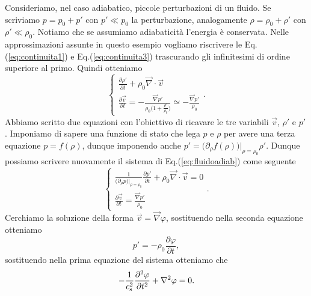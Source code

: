 \begin{example}
    Consideriamo, nel caso adiabatico, piccole perturbazioni di un fluido. Se scriviamo $p = p_0 + p'$ con $p' \ll p_0$ la perturbazione, analogamente $\rho = \rho_0 + \rho '$ con $\rho' \ll \rho_0$. Notiamo che se assumiamo adiabaticità l'energia è conservata. Nelle approssimazioni assunte in questo esempio vogliamo riscrivere le Eq.(\ref{eq:continuita1}) e Eq.(\ref{eq:continuita3}) trascurando gli infinitesimi di ordine superiore al primo. Quindi otteniamo
    \begin{equation}
        \begin{cases}
        \displaystyle\frac{\partial \rho'}{\partial t} + \rho_0 \vec{\nabla} \cdot \vec{v}\\
        \displaystyle\frac{\partial \vec{v}}{\partial t} = - \frac{\vec{\nabla}p'}{\rho_0\bigl( 1 + \frac{\rho'}{\rho_0} \bigr)} \simeq - \frac{\vec{\nabla} p'}{\rho_0}
        \end{cases}.\label{eq:fluidoadiab}
    \end{equation}
    Abbiamo scritto due equazioni con l'obiettivo di ricavare le tre variabili $\vec{v}$, $\rho'$ e $p'$. Imponiamo di sapere una funzione di stato che lega $p$ e $\rho$ per avere una terza equazione $p = f(\rho)$, dunque imponendo anche $p' = \bigl(\partial_\rho f(\rho)\bigr)\bigr|_{\rho = \rho_0}\rho'$. Dunque possiamo scrivere nuovamente il sistema di Eq.(\ref{eq:fluidoadiab}) come seguente
    \begin{equation*}
        \begin{cases}
            \displaystyle\frac{1}{\bigl(\partial_\rho p\bigr)\bigr|_{\rho = \rho_0}} \frac{\partial p'}{\partial t} + \rho_0 \vec{\nabla} \cdot \vec{v} = 0\\
            \displaystyle\frac{\partial \vec{v}}{\partial t} = \frac{\vec{\nabla} p'}{\rho_0}
        \end{cases}.
    \end{equation*}
    Cerchiamo la soluzione della forma $\vec{v} = \vec{\nabla} \varphi$, sostituendo nella seconda equazione otteniamo
    \begin{equation*}
        p' = - \rho_0 \frac{\partial \varphi}{\partial t},
    \end{equation*}
    sostituendo nella prima equazione del sistema otteniamo che 
    \begin{equation}
        - \frac{1}{c_\textup{s}^2} \frac{\partial ^2 \varphi}{\partial t^2} + \nabla^2 \varphi = 0. \label{eq:fluidonda}

\end{equation}
\end{example}
